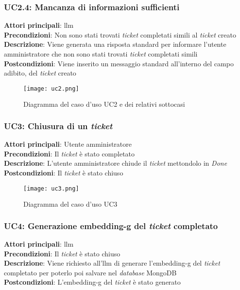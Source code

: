 \subsubsection{UC2.4: Mancanza di informazioni sufficienti}
\textbf{Attori principali}: \gls{llm} \\
\textbf{Precondizioni}: Non sono stati trovati \textit{ticket} completati simili al \textit{ticket} creato \\
\textbf{Descrizione}: Viene generata una risposta standard per informare l'utente amministratore che non sono stati trovati \textit{ticket} completati simili \\
\textbf{Postcondizioni}: Viene inserito un messaggio standard all'interno del campo adibito, del \textit{ticket} creato \\

\begin{figure}[H]
    \centering
    \texttt{[image: uc2.png]}
    \caption{Diagramma del caso d'uso UC2 e dei relativi sottocasi}
    \label{fig:UC2}
\end{figure}

\subsubsection{UC3: Chiusura di un \textit{ticket}}
\textbf{Attori principali}: Utente amministratore \\
\textbf{Precondizioni}: Il \textit{ticket} è stato completato \\
\textbf{Descrizione}: L'utente amministratore chiude il \textit{ticket} mettondolo in \textit{Done}\\ 
\textbf{Postcondizioni}: Il \textit{ticket} è stato chiuso \\

\begin{figure}[H]
    \centering
    \texttt{[image: uc3.png]}
    \caption{Diagramma del caso d'uso UC3}
    \label{fig:UC3}
\end{figure}


\subsubsection{UC4: Generazione \gls{embedding-g} del \textit{ticket} completato}
\textbf{Attori principali}: \gls{llm} \\
\textbf{Precondizioni}: Il \textit{ticket} è stato chiuso \\
\textbf{Descrizione}: Viene richiesto all'\gls{llm} di generare l'\gls{embedding-g} del \textit{ticket} completato per poterlo poi salvare nel \textit{database} MongoDB \\
\textbf{Postcondizioni}: L'\gls{embedding-g} del \textit{ticket} è stato generato \\

